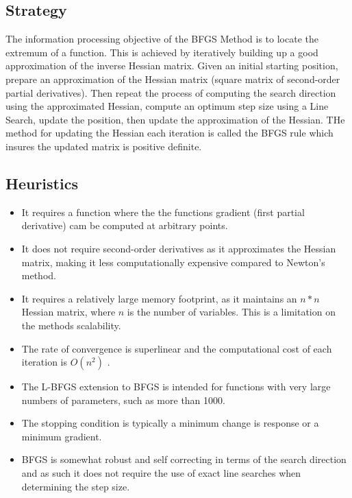 \subsection{Strategy}
The information processing objective of the BFGS Method is to locate the extremum of a function. 
This is achieved by iteratively building up a good approximation of the inverse Hessian matrix.
Given an initial starting position, prepare an approximation of the Hessian matrix (square matrix of second-order partial derivatives). Then repeat the process of computing the search direction using the approximated Hessian, compute an optimum step size using a Line Search, update the position, then update the approximation of the Hessian. THe method for updating the Hessian each iteration is called the BFGS rule which insures the updated matrix is positive definite.

\subsection{Heuristics}

\begin{itemize}
	\item It requires a function where the the functions gradient (first partial derivative) cam be computed at arbitrary points.
	\item It does not require second-order derivatives as it approximates the Hessian matrix, making it less computationally expensive compared to Newton's method.
	\item It requires a relatively large memory footprint, as it maintains an $n*n$ Hessian matrix, where $n$ is the number of variables. This is a limitation on the methods scalability.
	\item The rate of convergence is superlinear and the computational cost of each iteration is $O(n^2)$ \cite{Nocedal1999}.
	\item The L-BFGS extension to BFGS is intended for functions with very large numbers of parameters, such as more than 1000.
	\item The stopping condition is typically a minimum change is response or a minimum gradient.
	\item BFGS is somewhat robust and self correcting in terms of the search direction and as such it does not require the use of exact line searches when determining the step size.
\end{itemize}

